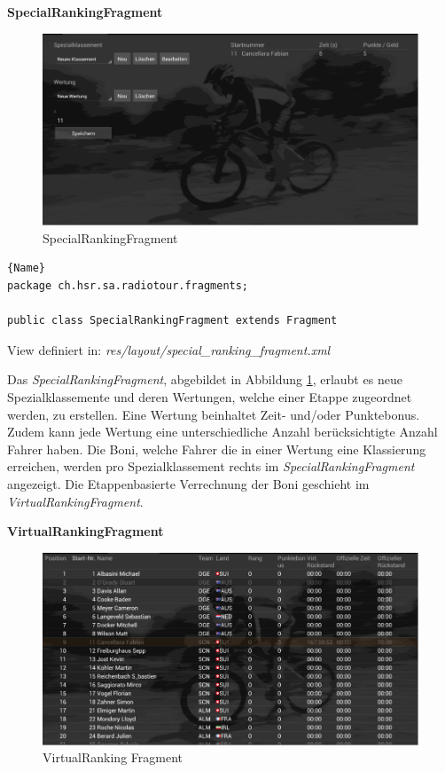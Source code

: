 \textbf{SpecialRankingFragment}
\begin{figure}[h!]
\caption{SpecialRankingFragment}
\label{fig:specialrankingfragment}
\centering
\includegraphics[scale=0.8]{07anhang/images/dev_specialranking.png}
\end{figure}


\begin{lstlisting}{Name}
package ch.hsr.sa.radiotour.fragments;

public class SpecialRankingFragment extends Fragment
\end{lstlisting}

View definiert in:
\textit{res/layout/special\_ranking\_fragment.xml}

Das \textit{SpecialRankingFragment}, abgebildet in Abbildung \ref{fig:specialrankingfragment}, erlaubt es neue Spezialklassemente und deren Wertungen, welche einer Etappe zugeordnet werden, zu erstellen. Eine Wertung beinhaltet Zeit- und/oder Punktebonus. Zudem kann jede Wertung eine unterschiedliche Anzahl berücksichtigte Anzahl Fahrer haben. Die Boni, welche Fahrer die in einer Wertung eine Klassierung erreichen, werden pro Spezialklassement rechts im \textit{SpecialRankingFragment} angezeigt. Die Etappenbasierte Verrechnung der Boni geschieht im \textit{VirtualRankingFragment}.




\textbf{VirtualRankingFragment}

\begin{figure}[h!]
\caption{VirtualRanking Fragment}
\label{fig:virtualrankingfragment}
\centering
\includegraphics[scale=0.8]{07anhang/images/dev_virtual.png}
\end{figure}

